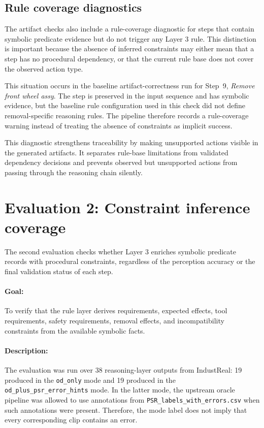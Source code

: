 \subsection{Rule coverage diagnostics}
\label{sec:evaluation-rule-coverage-diagnostics}

The artifact checks also include a rule-coverage diagnostic for steps that contain symbolic predicate evidence but do not trigger any Layer 3 rule. This distinction is important because the absence of inferred constraints may either mean that a step has no procedural dependency, or that the current rule base does not cover the observed action type.

This situation occurs in the baseline artifact-correctness run for Step~9, \textit{Remove front wheel assy}. The step is preserved in the input sequence and has symbolic evidence, but the baseline rule configuration used in this check did not define removal-specific reasoning rules. The pipeline therefore records a rule-coverage warning instead of treating the absence of constraints as implicit success.

This diagnostic strengthens traceability by making unsupported actions visible in the generated artifacts. It separates rule-base limitations from validated dependency decisions and prevents observed but unsupported actions from passing through the reasoning chain silently.

\section{Evaluation 2: Constraint inference coverage}
\label{sec:evaluation-constraint-coverage}

The second evaluation checks whether Layer 3 enriches symbolic predicate records
with procedural constraints, regardless of the perception accuracy or the final validation status of each step. 

\paragraph{Goal:}
To verify that the rule layer derives requirements, expected effects, tool requirements, safety requirements, removal effects, and incompatibility constraints from the available symbolic facts. 

\paragraph{Description:}
The evaluation was run over 38 reasoning-layer outputs from IndustReal: 19 produced in the \texttt{od\_only} mode and 19 produced in the \texttt{od\_plus\_psr\_error\_hints} mode. In the latter mode, the upstream oracle pipeline was allowed to use annotations from \texttt{PSR\_labels\_with\_errors.csv} when such annotations were present. Therefore, the mode label does not imply that every corresponding clip contains an error.

